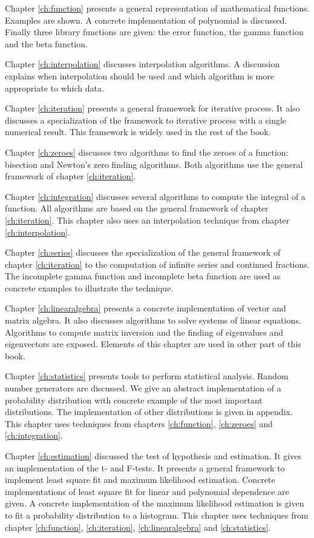 \documentclass[twoside]{book}
\begin{document}
Chapter \ref{ch:function} presents a general representation of
mathematical functions. Examples are shown. A concrete
implementation of polynomial is discussed. Finally three library
functions are given: the error function, the gamma function and
the beta function.

Chapter \ref{ch:interpolation} discusses interpolation algorithms.
A discussion explains when interpolation should be used and which
algorithm is more appropriate to which data.

Chapter \ref{ch:iteration} presents a general framework for
iterative process. It also discusses a specialization of the
framework to iterative process with a single numerical result.
This framework is widely used in the rest of the book.

Chapter \ref{ch:zeroes} discusses two algorithms to find the
zeroes of a function: bisection and Newton's zero finding
algorithms. Both algorithms use the general framework of chapter
\ref{ch:iteration}.

Chapter \ref{ch:integration} discusses several algorithms to
compute the integral of a function. All algorithms are based on
the general framework of chapter \ref{ch:iteration}. This chapter
also uses an interpolation technique from chapter
\ref{ch:interpolation}.

Chapter \ref{ch:series} discusses the specialization of the
general framework of chapter \ref{ch:iteration} to the computation
of infinite series and continued fractions. The incomplete gamma
function and incomplete beta function are used as concrete
examples to illustrate the technique.

Chapter \ref{ch:linearalgebra} presents a concrete implementation
of vector and matrix algebra. It also discusses algorithms to
solve systems of linear equations. Algorithms to compute matrix
inversion and the finding of eigenvalues and eigenvectors are
exposed. Elements of this chapter are used in other part of this
book.

Chapter \ref{ch:statistics} presents tools to perform statistical
analysis. Random number generators are discussed. We give an
abstract implementation of a probability distribution with
concrete example of the most important distributions. The
implementation of other distributions is given in appendix. This
chapter uses techniques from chapters \ref{ch:function},
\ref{ch:zeroes} and \ref{ch:integration}.

Chapter \ref{ch:estimation} discussed the test of hypothesis and
estimation. It gives an implementation of the t- and F-tests. It
presents a general framework to implement least square fit and
maximum likelihood estimation. Concrete implementations of least
square fit for linear and polynomial dependence are given. A
concrete implementation of the maximum likelihood estimation is
given to fit a probability distribution to a histogram. This
chapter uses techniques from chapter \ref{ch:function},
\ref{ch:iteration}, \ref{ch:linearalgebra} and
\ref{ch:statistics}.
\end{document}
